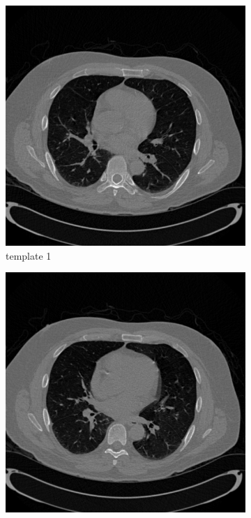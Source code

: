 \documentclass{article}
\begin{document}
\begin{figure}[h]
    \begin{subfigure}[b]{0.3\linewidth}
        \includegraphics[width=\textwidth]{../images/supplementary/colon/template1.png}
        \caption{template 1}
    \end{subfigure}
    \begin{subfigure}[b]{0.3\linewidth}
        \includegraphics[width=\textwidth]{../images/supplementary/colon/template2.png}

\end{subfigure}
\end{figure}
\end{document}
